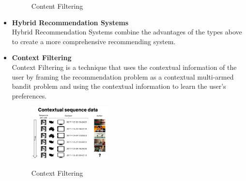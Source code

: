 \begin{itemize}
\begin{figure}[H]
        \caption{Content Filtering}
        \label{fig:content-filtering}
        \cite{NvidiaRecSys}
    \end{figure}
    \item \textbf{Hybrid Recommendation Systems}\\Hybrid Recommendation Systems combine the advantages of the types above to create a more comprehensive recommending system.
    \item \textbf{Context Filtering}\\Context Filtering is a technique that uses the contextual information of the user by framing the recommendation problem as a contextual multi-armed bandit problem and using the contextual information to learn the user's preferences.
    \begin{figure}[H]
        \centering
        \includegraphics[width=0.4\textwidth]{assets/contextual-sequence-prediction.png}
        \caption{Context Filtering}
        \label{fig:costextual-filtering}
        \cite{NvidiaRecSys}
    \end{figure}
\end{itemize}

